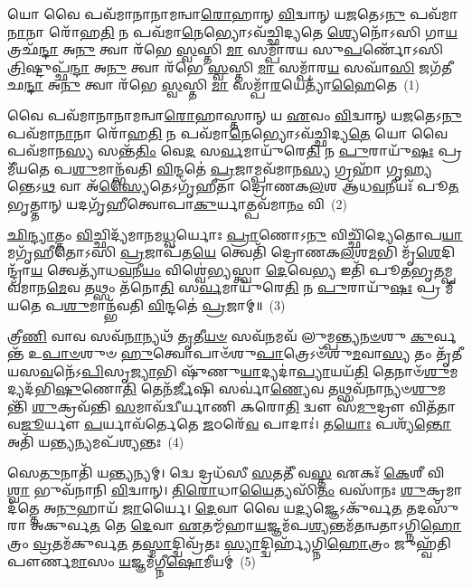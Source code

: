 \setcounter{anuvakam}{0}
𑌯𑍋 𑌵𑍈 𑌪𑌵᳴𑌮𑌾𑌨𑌾𑌨𑌾𑌮𑌨𑍍𑌵𑌾\-\ul{𑌰𑍋}\-𑌹𑌾𑌨𑍍 \ul{𑌵𑌿}\-𑌦𑍍𑌵𑌾𑌨𑍍 𑌯\-\ul{𑌜}\-𑌤𑍇\-𑌽\-\ul{𑌨𑍁} 𑌪𑌵᳴𑌮𑌾\-\ul{𑌨𑌾}\-𑌨𑌾 𑌰𑍋᳴𑌹\-\ul{𑌤𑌿} 𑌨 𑌪𑌵᳴𑌮𑌾\-\ul{𑌨𑍇}\-𑌭𑍍𑌯𑍋\-𑌽𑌵᳴𑌚𑍍𑌛𑌿𑌦𑍍𑌯𑌤𑍇 \ul{𑌶𑍍𑌯𑍇}\-𑌨𑍋᳴\-𑌽𑌸𑌿 𑌗𑌾\-\ul{𑌯}\-𑌤𑍍𑌰𑌛᳴\-\ul{𑌨𑍍𑌦𑌾} 𑌅\-\ul{𑌨𑍁} 𑌤𑍍𑌵𑌾 𑌰᳴𑌭𑍇 \ul{𑌸𑍍𑌵}\-𑌸𑍍𑌤𑌿 \ul{𑌮𑌾} 𑌸𑌮𑍍𑌪𑌾᳴𑌰𑌯 𑌸𑍁\-\ul{𑌪}\-𑌰𑍍𑌣𑍋᳴\-𑌽𑌸𑌿 \ul{𑌤𑍍𑌰𑌿}\-𑌷𑍍𑌟𑍁𑌪𑍍𑌛᳴\-\ul{𑌨𑍍𑌦𑌾} 𑌅\-\ul{𑌨𑍁} 𑌤𑍍𑌵𑌾 𑌰᳴𑌭𑍇 \ul{𑌸𑍍𑌵}\-𑌸𑍍𑌤𑌿 \ul{𑌮𑌾} 𑌸𑌮𑍍𑌪𑌾᳴𑌰\-\ul{𑌯} 𑌸𑌘𑌾᳴\-\ul{𑌸𑌿} 𑌜𑌗᳴𑌤𑍀𑌛\-\ul{𑌨𑍍𑌦𑌾} 𑌅\-\ul{𑌨𑍁} 𑌤𑍍𑌵𑌾 𑌰᳴𑌭𑍇 \ul{𑌸𑍍𑌵}\-𑌸𑍍𑌤𑌿 \ul{𑌮𑌾} 𑌸𑌮𑍍𑌪𑌾᳴\-\ul{𑌰}\-𑌯𑍇𑌤𑍍𑌯𑌾᳴\-\ul{𑌹𑍈}\-𑌤𑍇~(1)

𑌵𑍈 𑌪𑌵᳴𑌮𑌾𑌨𑌾𑌨𑌾𑌮𑌨𑍍𑌵𑌾\-\ul{𑌰𑍋}\-𑌹𑌾𑌸𑍍𑌤𑌾𑌨𑍍 𑌯 \ul{𑌏}\-𑌵𑌂 \ul{𑌵𑌿}\-𑌦𑍍𑌵𑌾𑌨𑍍 𑌯\-\ul{𑌜}\-𑌤𑍇\-𑌽\-\ul{𑌨𑍁} 𑌪𑌵᳴𑌮𑌾\-\ul{𑌨𑌾}\-𑌨𑌾 𑌰𑍋᳴𑌹\-\ul{𑌤𑌿} 𑌨 𑌪𑌵᳴𑌮𑌾\-\ul{𑌨𑍇}\-𑌭𑍍𑌯𑍋\-𑌽𑌵᳴𑌚𑍍𑌛𑌿𑌦𑍍𑌯\-\ul{𑌤𑍇} 𑌯𑍋 𑌵𑍈 𑌪𑌵᳴𑌮𑌾𑌨\-\ul{𑌸𑍍𑌯} 𑌸𑌨𑍍𑌤᳴\-\ul{𑌤𑌿𑌂} 𑌵𑍇\-\ul{𑌦} 𑌸\-\ul{𑌰𑍍𑌵}\-𑌮𑌾𑌯𑍁᳴𑌰𑍇\-\ul{𑌤𑌿} 𑌨 \ul{𑌪𑍁}\-𑌰𑌾𑌯𑍁᳴\-\ul{𑌷𑌃} 𑌪𑍍𑌰 𑌮𑍀᳴𑌯𑌤𑍇 𑌪\-\ul{𑌶𑍁}\-𑌮𑌾𑌨𑍍𑌭᳴𑌵𑌤𑌿 \ul{𑌵𑌿}\-𑌨𑍍𑌦𑌤𑍇॑ \ul{𑌪𑍍𑌰}\-𑌜𑌾𑌮𑍍𑌪𑌵᳴𑌮𑌾𑌨\-\ul{𑌸𑍍𑌯} 𑌗𑍍𑌰𑌹𑌾᳴ 𑌗𑍃\-\ul{𑌹𑍍𑌯}\-𑌨𑍍𑌤𑍇\-𑌽\-\ul{𑌥} 𑌵𑌾 𑌅᳴\-\ul{𑌸𑍍𑌯𑍈}\-𑌤𑍇\-𑌽𑌗𑍃᳴𑌹𑍀𑌤𑌾 𑌦𑍍𑌰𑍋𑌣𑌕\-\ul{𑌲}\-𑌶 𑌆᳴𑌧\-\ul{𑌵}\-𑌨𑍀𑌯𑌃᳴ 𑌪𑍂\-\ul{𑌤}\-𑌭𑍃𑌤𑍍𑌤𑌾𑌨𑍍 𑌯𑌦𑌗𑍃᳴𑌹𑍀𑌤𑍍𑌵𑍋𑌪𑌾\-\ul{𑌕𑍁}\-𑌰𑍍𑌯𑌾𑌤𑍍𑌪𑌵᳴𑌮𑌾\-\ul{𑌨𑌂} 𑌵𑌿~(2)

\-\ul{𑌛𑌿}\-\-\ul{𑌨𑍍𑌦𑍍𑌯𑌾}\-𑌤𑍍𑌤𑌂 \ul{𑌵𑌿}\-𑌚𑍍𑌛𑌿𑌦𑍍𑌯᳴𑌮𑌾𑌨𑌮\-\ul{𑌧𑍍𑌵}\-𑌰𑍍𑌯𑍋𑌃 \ul{𑌪𑍍𑌰𑌾}\-𑌣𑍋\-𑌽\-\ul{𑌨𑍁} 𑌵𑌿𑌚𑍍𑌛𑌿᳴𑌦𑍍𑌯𑍇𑌤𑍋𑌪\-\ul{𑌯𑌾}\-𑌮𑌗𑍃᳴𑌹𑍀𑌤𑍋\-𑌽𑌸𑌿 \ul{𑌪𑍍𑌰}\-𑌜𑌾𑌪᳴𑌤\-\ul{𑌯𑍇} 𑌤𑍍𑌵𑍇𑌤𑌿᳴ 𑌦𑍍𑌰𑍋𑌣𑌕\-\ul{𑌲}\-𑌶\-\ul{𑌮}\-𑌭𑌿 𑌮𑍃᳴\-\ul{𑌶𑍇}\-𑌦𑌿𑌨𑍍𑌦𑍍𑌰𑌾᳴\-\ul{𑌯} 𑌤𑍍𑌵𑍇𑌤𑍍𑌯𑌾᳴𑌧\-\ul{𑌵}\-𑌨𑍀\-\ul{𑌯𑌂} 𑌵𑌿𑌶𑍍𑌵𑍇॑𑌭𑍍𑌯𑌸𑍍𑌤𑍍𑌵𑌾 \ul{𑌦𑍇}\-𑌵𑍇\-\ul{𑌭𑍍𑌯} 𑌇𑌤𑌿᳴ 𑌪𑍂\-\ul{𑌤}\-𑌭𑍃\-\ul{𑌤}\-𑌮𑍍𑌪𑌵᳴𑌮𑌾𑌨\-\ul{𑌮𑍇}\-𑌵 𑌤𑌥𑍍𑌸𑌂 𑌤᳴𑌨𑍋\-\ul{𑌤𑌿} 𑌸\-\ul{𑌰𑍍𑌵}\-𑌮𑌾𑌯𑍁᳴𑌰𑍇\-\ul{𑌤𑌿} 𑌨 \ul{𑌪𑍁}\-𑌰𑌾𑌯𑍁᳴\-\ul{𑌷𑌃} 𑌪𑍍𑌰 𑌮𑍀᳴𑌯𑌤𑍇 𑌪\-\ul{𑌶𑍁}\-𑌮𑌾𑌨𑍍𑌭᳴𑌵𑌤𑌿 \ul{𑌵𑌿}\-𑌨𑍍𑌦𑌤𑍇॑ \ul{𑌪𑍍𑌰}\-𑌜𑌾𑌮𑍍॥~(3)

{\anuvakamend[{\-\ul{𑌏}\-𑌤𑍇 𑌵𑌿 𑌦𑍍𑌵𑌿𑌚᳴𑌤𑍍𑌵𑌾𑌰𑌿𑍞𑌶𑌚𑍍𑌚}]}%

𑌤𑍍𑌰𑍀\-\ul{𑌣𑌿} 𑌵𑌾𑌵 𑌸𑌵᳴\-\ul{𑌨𑌾}\-𑌨𑍍𑌯𑌥᳴ \ul{𑌤𑍃}\-𑌤𑍀\-\ul{𑌯}\-\-\ul{𑍞} 𑌸𑌵᳴\-\ul{𑌨}\-𑌮𑌵᳴ 𑌲𑍁𑌮𑍍𑌪𑌨𑍍𑌤𑍍𑌯\-\ul{𑌨}\-\-\ul{𑍞}\-𑌶𑍁 \ul{𑌕𑍁}\-𑌰𑍍𑌵𑌨𑍍𑌤᳴ 𑌉\-\ul{𑌪𑌾}\-\-\ul{𑍞}\-𑌶𑍁𑍞 \ul{𑌹𑍁}\-𑌤𑍍𑌵𑍋𑌪𑌾𑍞᳴𑌶𑍁\-\ul{𑌪𑌾}\-𑌤𑍍𑌰𑍇\-𑌽𑍞᳴𑌶𑍁\-\ul{𑌮}\-𑌵𑌾\-\ul{𑌸𑍍𑌯} 𑌤𑌂 𑌤𑍃᳴𑌤𑍀𑌯𑌸\-\ul{𑌵}\-𑌨𑍇᳴\-𑌽\-\ul{𑌪𑌿}\-𑌸𑍃\-\ul{𑌜𑍍𑌯𑌾}\-𑌭𑌿 𑌷𑍁᳴𑌣𑍁\-\ul{𑌯𑌾}\-𑌦𑍍𑌯𑌦𑌾॑\-\ul{𑌪𑍍𑌯𑌾}\-𑌯𑌯᳴\-\ul{𑌤𑌿} 𑌤𑍇𑌨𑌾𑍞᳴\-\ul{𑌶𑍁}\-𑌮𑌦𑍍𑌯𑌦᳴𑌭𑌿\-\ul{𑌷𑍁}\-𑌣𑍋\-\ul{𑌤𑌿} 𑌤𑍇𑌨᳴\-\ul{𑌰𑍍𑌜𑍀}\-𑌷𑌿 𑌸𑌰𑍍𑌵𑌾॑\-\ul{𑌣𑍍𑌯𑍇}\-𑌵 𑌤𑌥𑍍𑌸𑌵᳴𑌨𑌾𑌨𑍍𑌯𑍞\-\ul{𑌶𑍁}\-𑌮𑌨𑍍𑌤𑌿᳴ \ul{𑌶𑍁}\-𑌕𑍍𑌰𑌵᳴𑌨𑍍𑌤𑌿 \ul{𑌸}\-𑌮𑌾𑌵᳴𑌦𑍍𑌵𑍀𑌰𑍍𑌯𑌾𑌣𑌿 𑌕𑌰𑍋\-\ul{𑌤𑌿} 𑌦𑍍𑌵𑍗 𑌸᳴\-\ul{𑌮𑍁}\-𑌦𑍍𑌰𑍗 𑌵𑌿𑌤᳴𑌤𑌾𑌵\-\ul{𑌜𑍂}\-𑌰𑍍𑌯𑍗 \ul{𑌪}\-𑌰𑍍𑌯𑌾𑌵᳴𑌰𑍍𑌤𑍇𑌤𑍇 \ul{𑌜}\-𑌠𑌰𑍇᳴\-\ul{𑌵} 𑌪𑌾𑌦𑌾𑌃॑। 𑌤\-\ul{𑌯𑍋𑌃} 𑌪𑌶𑍍𑌯᳴\-\ul{𑌨𑍍𑌤𑍋} 𑌅𑌤𑌿᳴ 𑌯\-\ul{𑌨𑍍𑌤𑍍𑌯}\-𑌨𑍍𑌯𑌮𑌪᳴𑌶𑍍𑌯𑌨𑍍𑌤𑌃~(4)

𑌸𑍇\-\ul{𑌤𑍁}\-𑌨𑌾𑌤𑌿᳴ 𑌯\-\ul{𑌨𑍍𑌤𑍍𑌯}\-𑌨𑍍𑌯𑌮𑍍। 𑌦𑍍𑌵𑍇 𑌦𑍍𑌰𑌧᳴𑌸𑍀 \ul{𑌸}\-𑌤𑌤𑍀᳴ 𑌵\-\ul{𑌸𑍍𑌤} 𑌏𑌕𑌃᳴ \ul{𑌕𑍇}\-𑌶𑍀 𑌵𑌿\-\ul{𑌶𑍍𑌵𑌾} 𑌭𑍁𑌵᳴𑌨𑌾𑌨𑌿 \ul{𑌵𑌿}\-𑌦𑍍𑌵𑌾𑌨𑍍। \ul{𑌤𑌿}\-\-\ul{𑌰𑍋}\-𑌧𑌾\-\ul{𑌯𑍈}\-𑌤𑍍𑌯𑌸𑌿᳴\-\ul{𑌤𑌂} 𑌵𑌸𑌾᳴𑌨𑌃 \ul{𑌶𑍁}\-𑌕𑍍𑌰𑌮𑌾 𑌦᳴𑌤𑍍𑌤𑍇 𑌅\-\ul{𑌨𑍁}\-𑌹𑌾𑌯᳴ \ul{𑌜𑌾}\-𑌰𑍍𑌯𑍈। \ul{𑌦𑍇}\-𑌵𑌾 𑌵𑍈 𑌯\-\ul{𑌦𑍍𑌯}\-𑌜𑍍𑌞𑍇\-𑌽𑌕𑍁᳴𑌰𑍍𑌵\-\ul{𑌤} 𑌤𑌦𑌸𑍁᳴𑌰𑌾 𑌅𑌕𑍁𑌰𑍍𑌵\-\ul{𑌤} 𑌤𑍇 \ul{𑌦𑍇}\-𑌵𑌾 \ul{𑌏}\-𑌤𑌮𑍍𑌮᳴𑌹𑌾\-\ul{𑌯}\-𑌜𑍍𑌞𑌮᳴𑌪\-\ul{𑌶𑍍𑌯}\-𑌨𑍍𑌤𑌮᳴𑌤𑌨𑍍𑌵𑌤𑌾\-𑌽\-𑌗𑍍𑌨𑌿\-\ul{𑌹𑍋}\-𑌤𑍍𑌰𑌂 \ul{𑌵𑍍𑌰}\-𑌤𑌮᳴𑌕𑍁𑌰𑍍𑌵\-\ul{𑌤} 𑌤\-\ul{𑌸𑍍𑌮𑌾}\-𑌦𑍍𑌦𑍍𑌵𑌿𑌵𑍍𑌰᳴𑌤𑌃 \ul{𑌸𑍍𑌯𑌾}\-𑌦𑍍𑌦𑍍𑌵𑌿𑌰𑍍\mbox{}𑌹𑍍𑌯᳴𑌗𑍍𑌨𑌿\-\ul{𑌹𑍋}\-𑌤𑍍𑌰𑌂 𑌜𑍁𑌹𑍍𑌵᳴𑌤𑌿 𑌪𑍗𑌰𑍍𑌣\-\ul{𑌮𑌾}\-𑌸𑌂 \ul{𑌯}\-𑌜𑍍𑌞𑌮᳴𑌗𑍍𑌨𑍀\-\ul{𑌷𑍋}\-𑌮𑍀𑌯𑌮𑍍॑~(5)

